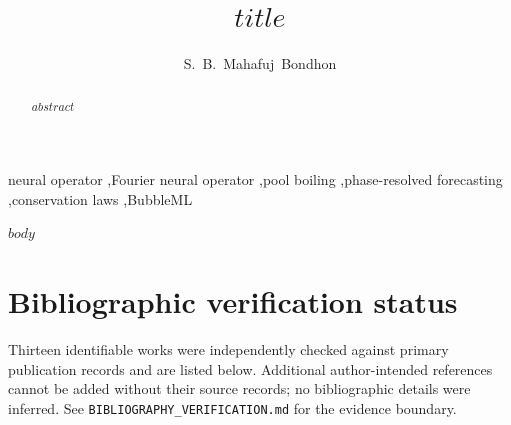 \documentclass[preprint,12pt]{elsarticle}
\begin{document}
\sloppy
\begin{frontmatter}

\title{$title$}
\author[buet]{S.~B.~Mahafuj~Bondhon}


\begin{abstract}
$abstract$
\end{abstract}

\begin{keyword}
neural operator \sep Fourier neural operator \sep pool boiling \sep phase-resolved forecasting \sep conservation laws \sep BubbleML
\end{keyword}

\end{frontmatter}

$body$

\section*{Bibliographic verification status}
Thirteen identifiable works were independently checked against primary publication
records and are listed below. Additional author-intended references cannot be
added without their source records; no bibliographic details were inferred. See
\texttt{BIBLIOGRAPHY\_VERIFICATION.md} for the evidence boundary.

\nocite{hassan2023bubbleml,li2021fno,ronneberger2015unet,tran2023ffno,rahman2022uno,hassan2025bubbleformer,zuber1959hydrodynamic,dunlap2026open,ravichandran2021decrypting,ravichandran2023dryareas,kalimuthu2025loglo,richterpowell2022neural,li2026project}


\end{document}

